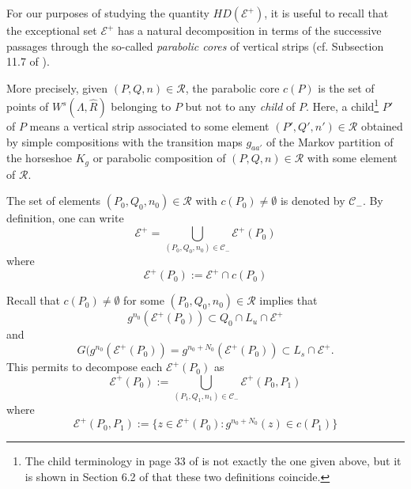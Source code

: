 \documentclass[12pt]{amsart}
\numberwithin{equation}{section}
\theoremstyle{definition}
\newcommand{\<}{{\langle}}
\renewcommand{\>}{{\rangle}}
\begin{document}
For our purposes of studying the quantity $HD(\mathcal{E}^+)$, it is useful to recall that the exceptional set $\mathcal{E}^+$ has a natural decomposition in terms of the successive passages through the so-called  \emph{parabolic cores} of vertical strips (cf. Subsection 11.7 of \cite{PY09}). 

More precisely, given $(P,Q,n)\in\mathcal{R}$, the parabolic core $c(P)$ is the set of points of $W^s(\Lambda,\widehat{R})$ belonging to $P$ but not to any \emph{child} of $P$. Here, a child\footnote{The child terminology in page 33 of \cite{PY09} is not exactly the one given above, but it is shown in Section 6.2 of \cite{PY09} that these two definitions coincide.} $P'$ of $P$ means a vertical strip associated to some element $(P',Q',n')\in\mathcal{R}$ obtained by simple compositions with the transition maps $g_{aa'}$ of the Markov partition of the horseshoe $K_g$ or parabolic composition of $(P,Q,n)\in\mathcal{R}$ with some element of $\mathcal{R}$. 

The set of elements $(P_0, Q_0, n_0)\in\mathcal{R}$ with $c(P_0)\neq\emptyset$ is denoted by $\mathcal{C}_-$. By definition, one can write 
$$\mathcal{E}^+=\bigcup\limits_{(P_0, Q_0, n_0)\in\mathcal{C}_-}\mathcal{E}^+(P_0)$$
where 
$$\mathcal{E}^+(P_0):=\mathcal{E}^+\cap c(P_0)$$

Recall that $c(P_0)\neq\emptyset$ for some $(P_0,Q_0,n_0)\in\mathcal{R}$ implies that 
$$g^{n_0}(\mathcal{E}^+(P_0))\subset Q_0\cap L_u\cap\mathcal{E}^+$$ and 
$$G(g^{n_0}(\mathcal{E}^+(P_0))=g^{n_0+N_0}(\mathcal{E}^+(P_0))\subset L_s\cap\mathcal{E}^+.$$
This permits to decompose each $\mathcal{E}^+(P_0)$ as 
$$\mathcal{E}^+(P_0):=\bigcup\limits_{(P_1,Q_1,n_1)\in\mathcal{C}_-}\mathcal{E}^+(P_0, P_1)$$
where 
$$\mathcal{E}^+(P_0, P_1):=\{z\in\mathcal{E}^+(P_0): g^{n_0+N_0}(z)\in c(P_1)\}$$ 
\end{document}
